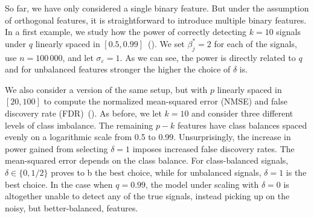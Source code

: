 So far, we have only considered a single binary feature. But under the assumption of orthogonal features, it is straightforward to introduce multiple binary features. In a first example, we study how the power of correctly detecting \(k=10\) signals under \(q\) linearly spaced in \([0.5, 0.99]\)~(). We set \(\beta^*_j = 2\) for each of the signals, use \(n = 100\,000\), and let \(\sigma_\varepsilon = 1\). As we can see, the power is directly related to \(q\) and for unbalanced features stronger the higher the choice of \(\delta\) is.

We also consider a version of the same setup, but with \(p\) linearly spaced in \([20, 100]\) to compute the normalized mean-squared error (NMSE) and false discovery rate (FDR)~(). As before, we let \(k = 10\) and consider three different levels of class imbalance. The remaining \(p-k\) features have class balances spaced evenly on a logarithmic scale from 0.5 to 0.99. Unsurprisingly, the increase in power gained from selecting \(\delta = 1\) imposes increased false discovery rates. The mean-squared error depends on the class balance. For class-balanced signals, \(\delta \in \{0, 1/2\}\) proves to b the best choice, while for unbalanced signals, \(\delta = 1\) is the best choice. In the case when \(q = 0.99\), the model under scaling with \(\delta = 0\) is altogether unable to detect any of the true signals, instead picking up on the noisy, but better-balanced, features.

